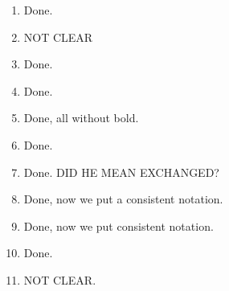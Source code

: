 \documentclass[10pt]{article}
\numberwithin{equation}{section}
\numberwithin{equation}{subsection}
\begin{document}
\begin{enumerate}
			\item Done.
			\item NOT CLEAR
			\item Done.
			\item Done.
			\item Done, all without bold.
			\item Done.
			\item Done. DID HE MEAN EXCHANGED?
			\item Done, now we put a consistent notation.
			\item Done, now we put consistent notation.
			\item Done.
			\item NOT CLEAR.
		\end{enumerate}
	
\end{document}
